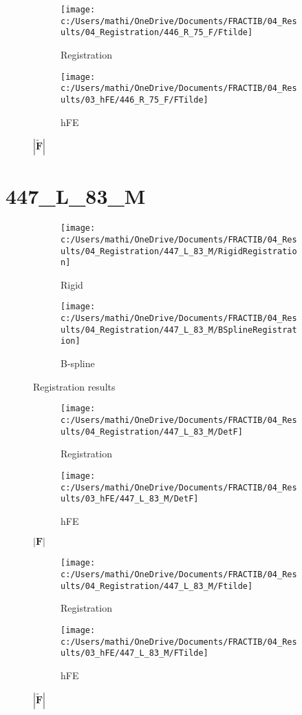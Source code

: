 \documentclass{article}%
\begin{document}
\begin{figure}[h!]%
\begin{subfigure}[b]{0.5\linewidth}%
\texttt{[image: c:/Users/mathi/OneDrive/Documents/FRACTIB/04\_Results/04\_Registration/446\_R\_75\_F/Ftilde]}%
\caption{Registration}%
\end{subfigure}%
\begin{subfigure}[b]{0.5\linewidth}%
\texttt{[image: c:/Users/mathi/OneDrive/Documents/FRACTIB/04\_Results/03\_hFE/446\_R\_75\_F/FTilde]}%
\caption{hFE}%
\end{subfigure}%
\caption{$|\widetilde{\mathbf{F}}|$}%
\end{figure}

%
\newpage%
\section*{447\_L\_83\_M}%
\label{sec:447L83M}%


\begin{figure}[h!]%
\begin{subfigure}[b]{0.5\linewidth}%
\texttt{[image: c:/Users/mathi/OneDrive/Documents/FRACTIB/04\_Results/04\_Registration/447\_L\_83\_M/RigidRegistration]}%
\caption{Rigid}%
\end{subfigure}%
\begin{subfigure}[b]{0.5\linewidth}%
\texttt{[image: c:/Users/mathi/OneDrive/Documents/FRACTIB/04\_Results/04\_Registration/447\_L\_83\_M/BSplineRegistration]}%
\caption{B{-}spline}%
\end{subfigure}%
\caption{Registration results}%
\end{figure}

%


\begin{figure}[h!]%
\begin{subfigure}[b]{0.5\linewidth}%
\texttt{[image: c:/Users/mathi/OneDrive/Documents/FRACTIB/04\_Results/04\_Registration/447\_L\_83\_M/DetF]}%
\caption{Registration}%
\end{subfigure}%
\begin{subfigure}[b]{0.5\linewidth}%
\texttt{[image: c:/Users/mathi/OneDrive/Documents/FRACTIB/04\_Results/03\_hFE/447\_L\_83\_M/DetF]}%
\caption{hFE}%
\end{subfigure}%
\caption{$|\mathbf{F}|$}%
\end{figure}

%


\begin{figure}[h!]%
\begin{subfigure}[b]{0.5\linewidth}%
\texttt{[image: c:/Users/mathi/OneDrive/Documents/FRACTIB/04\_Results/04\_Registration/447\_L\_83\_M/Ftilde]}%
\caption{Registration}%
\end{subfigure}%
\begin{subfigure}[b]{0.5\linewidth}%
\texttt{[image: c:/Users/mathi/OneDrive/Documents/FRACTIB/04\_Results/03\_hFE/447\_L\_83\_M/FTilde]}%
\caption{hFE}%
\end{subfigure}%
\caption{$|\widetilde{\mathbf{F}}|$}%
\end{figure}
\end{document}
